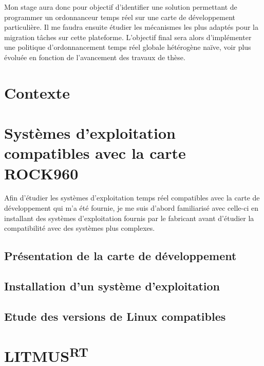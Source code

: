 \documentclass{article}
\newcommand{\litmus}{LITMUS\textsuperscript{RT}}
\begin{document}
    Mon stage aura donc pour objectif d'identifier une solution permettant de programmer un \gls{ordonnanceur} temps réel sur une carte de développement particulière. Il me faudra ensuite étudier les mécanismes les plus adaptés pour la migration tâches sur cette plateforme. L'objectif final sera alors d'implémenter une politique d'\gls{ordonnancement} temps réel globale hétérogène naïve, voir plus évoluée en fonction de l'avancement des travaux de thèse.
    
    \newpage
    \section{Contexte}
    
    


    \newpage
    \section[OS compatibles avec la carte]{Systèmes d'exploitation compatibles avec la carte ROCK960}

    Afin d'étudier les systèmes d'exploitation temps réel compatibles avec la carte de développement qui m'a été fournie, je me suis d'abord familiarisé avec celle-ci en installant des systèmes d'exploitation fournis par le fabricant avant d'étudier la compatibilité avec des systèmes plus complexes.


    \subsection{Présentation de la carte de développement}
    

    \subsection{Installation d'un système d'exploitation}
    

    \subsection{Etude des versions de Linux compatibles}
    

    
    \newpage
    \section{\litmus}
    \label{section:litmus}
    
\end{document}
